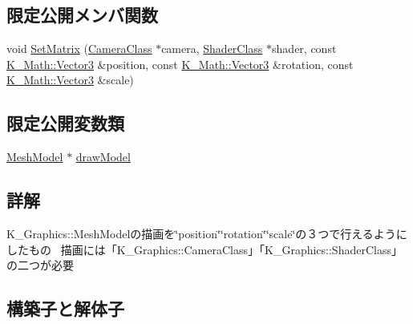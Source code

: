 \subsection*{限定公開メンバ関数}
\begin{DoxyCompactItemize}
\item 
void \mbox{\hyperlink{class_k___graphics_1_1_mesh_object_a29b665637b075b4839af390356c5bf3c}{Set\+Matrix}} (\mbox{\hyperlink{class_k___graphics_1_1_camera_class}{Camera\+Class}} $\ast$camera, \mbox{\hyperlink{class_k___graphics_1_1_shader_class}{Shader\+Class}} $\ast$shader, const \mbox{\hyperlink{namespace_k___math_a66884d78082c39ada4091c211f3570f8}{K\+\_\+\+Math\+::\+Vector3}} \&position, const \mbox{\hyperlink{namespace_k___math_a66884d78082c39ada4091c211f3570f8}{K\+\_\+\+Math\+::\+Vector3}} \&rotation, const \mbox{\hyperlink{namespace_k___math_a66884d78082c39ada4091c211f3570f8}{K\+\_\+\+Math\+::\+Vector3}} \&scale)
\end{DoxyCompactItemize}
\subsection*{限定公開変数類}
\begin{DoxyCompactItemize}
\item 
\mbox{\hyperlink{class_k___graphics_1_1_mesh_model}{Mesh\+Model}} $\ast$ \mbox{\hyperlink{class_k___graphics_1_1_mesh_object_a3691b447ef31ac253864166711b87ea7}{draw\+Model}}
\end{DoxyCompactItemize}


\subsection{詳解}
K\+\_\+\+Graphics\+::\+Mesh\+Modelの描画を\char`\"{}position\char`\"{}\char`\"{}rotation\char`\"{}\char`\"{}scale\char`\"{}の３つで行えるようにしたもの~\newline
描画には「\+K\+\_\+\+Graphics\+::\+Camera\+Class」「\+K\+\_\+\+Graphics\+::\+Shader\+Class」の二つが必要 

\subsection{構築子と解体子}
\mbox{\label{class_k___graphics_1_1_mesh_object_af59273310f07f67f766f9e90323ce641}} 
